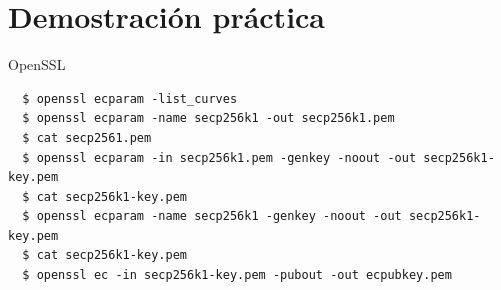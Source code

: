 \documentclass[12pt]{beamer}
\begin{document}
\section{Demostración práctica}\label{demo}
\begin{frame}[fragile]{OpenSSL}
\begin{verbatim}
  $ openssl ecparam -list_curves
  $ openssl ecparam -name secp256k1 -out secp256k1.pem
  $ cat secp2561.pem
  $ openssl ecparam -in secp256k1.pem -genkey -noout -out secp256k1-key.pem
  $ cat secp256k1-key.pem 
  $ openssl ecparam -name secp256k1 -genkey -noout -out secp256k1-key.pem
  $ cat secp256k1-key.pem
  $ openssl ec -in secp256k1-key.pem -pubout -out ecpubkey.pem
\end{verbatim}
\end{frame}
\end{document}

